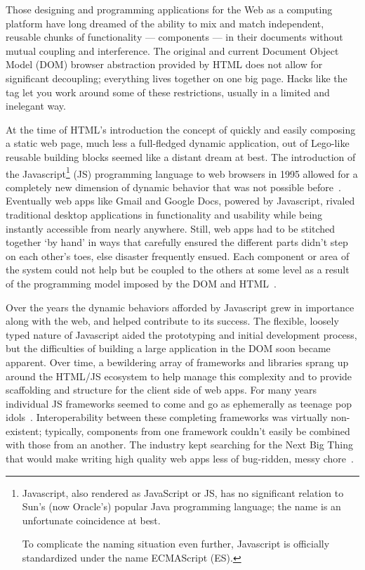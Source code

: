 Those designing and programming applications for the Web as a computing platform have long dreamed of the ability to mix and match independent, reusable chunks of functionality --- components --- in their documents without mutual coupling and interference. 
The original and current Document Object Model (DOM)
browser abstraction provided by HTML does not allow for significant decoupling; 
everything lives together on one big page. Hacks like the 
tag let you work around some of these restrictions, usually in a limited and inelegant way.

At the time of HTML's introduction the concept of quickly and easily composing a static web page, 
much less a full-fledged dynamic application, 
out of Lego-like reusable building blocks seemed like a distant dream at best. 
The introduction of the 
Javascript\footnote{Javascript, also rendered as JavaScript or JS, 
has no significant relation to Sun's (now Oracle's) popular Java programming language;
the name is an unfortunate coincidence at best.

To complicate the naming situation even further, Javascript is officially standardized under the name ECMAScript (ES).}
(JS) programming language to web browsers in 1995 allowed for a completely new dimension of dynamic behavior that was not possible before~\cite{w3ccontributors2012}.
Eventually web apps like Gmail and Google Docs, powered by Javascript, rivaled traditional desktop applications in functionality and usability while being instantly accessible from nearly anywhere.
Still, web apps had to be stitched together `by hand' in ways that carefully ensured the different parts didn't step on each other's toes, else disaster frequently ensued. 
Each component or area of the system could not help but be coupled to the others at some level as a result of the programming model imposed by the DOM and HTML~\cite{ihrig2012}.

Over the years the dynamic behaviors afforded by Javascript grew in importance along with the web, and helped contribute to its success. 
The flexible, loosely typed nature of Javascript aided the prototyping and initial development process,
but the difficulties of building a large application in the DOM soon became apparent.
Over time, a bewildering array of frameworks and libraries sprang up around the HTML/JS ecosystem to help manage this complexity and to provide scaffolding and structure for the client side of web apps.
For many years individual JS frameworks seemed to come and go as ephemerally as teenage pop idols~\cite{allenpike2015}. 
Interoperability between these completing frameworks was virtually non-existent; 
typically, components from one framework couldn't easily be combined with those from an another.
The industry kept searching for the Next Big Thing that would make writing high quality web apps less of bug-ridden, messy chore~\cite{allenpike2015}. 

